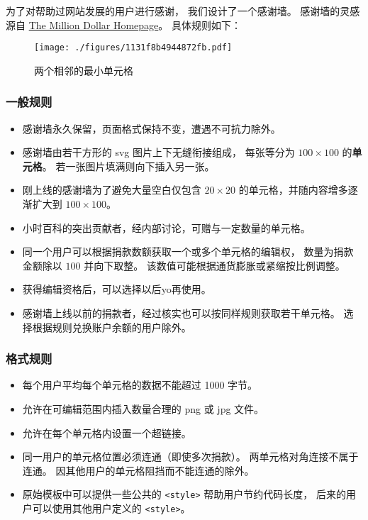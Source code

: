
\begin{issues}
\issueDraft
{}
\end{issues}

为了对帮助过网站发展的用户进行感谢， 我们设计了一个感谢墙。 感谢墙的灵感源自 \href{https://en.wikipedia.org/wiki/The_Million_Dollar_Homepage}{The Million Dollar Homepage}。 具体规则如下：

\begin{figure}[ht]
\centering
\texttt{[image: ./figures/1131f8b4944872fb.pdf]}
\caption{两个相邻的最小单元格} \label{fig_thanks_1}
\end{figure}

\subsubsection{一般规则}
\begin{itemize}
\item 感谢墙永久保留，页面格式保持不变，遭遇不可抗力除外。
\item 感谢墙由若干方形的 svg 图片上下无缝衔接组成， 每张等分为 $100\times 100$ 的\textbf{单元格}。 若一张图片填满则向下插入另一张。
\item 刚上线的感谢墙为了避免大量空白仅包含 $20\times 20$ 的单元格，并随内容增多逐渐扩大到 $100\times 100$。
\item 小时百科的突出贡献者，经内部讨论，可赠与一定数量的单元格。
\item 同一个用户可以根据捐款数额获取一个或多个单元格的编辑权， 数量为捐款金额除以 $100$ 并向下取整。 该数值可能根据通货膨胀或紧缩按比例调整。
\item 获得编辑资格后，可以选择以后yo再使用。
\item 感谢墙上线以前的捐款者，经过核实也可以按同样规则获取若干单元格。 选择根据规则兑换账户余额的用户除外。
\end{itemize}

\subsubsection{格式规则}
\begin{itemize}
\item 每个用户平均每个单元格的数据不能超过 1000 字节。
\item 允许在可编辑范围内插入数量合理的 png 或 jpg 文件。
\item 允许在每个单元格内设置一个超链接。
\item 同一用户的单元格位置必须连通（即使多次捐款）。 两单元格对角连接不属于连通。 因其他用户的单元格阻挡而不能连通的除外。
\item 原始模板中可以提供一些公共的 \verb`<style>` 帮助用户节约代码长度， 后来的用户可以使用其他用户定义的 \verb`<style>`。
\end{itemize}

